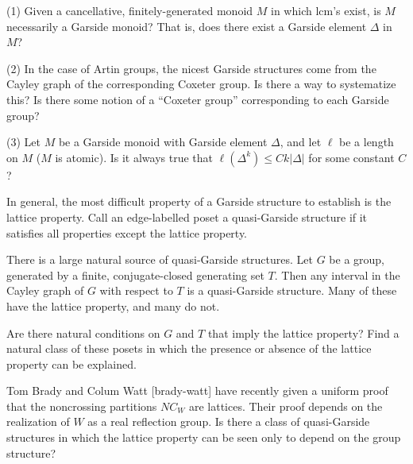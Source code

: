 \documentclass[12pt,letterpaper, reqno]{amsart}
\begin{document}
\begin{problemblock}
\begin{problem}[4.2] 

(1) Given a cancellative, finitely-generated monoid $M$ in which lcm's exist, is $M$ necessarily a Garside monoid? That is, does there exist a Garside element $\Delta$ in $M$?

(2) In the case of Artin groups, the nicest Garside structures come from the Cayley graph of the corresponding Coxeter group. Is there a way to systematize this? Is there some notion of a ``Coxeter group'' corresponding to each Garside group?

(3) Let $M$ be a Garside monoid with Garside element $\Delta$, and let $\ell$ be a length on $M$ ($M$ is atomic). Is it always true that $\ell(\Delta^k)\leq Ck\left|\Delta\right| $ for some constant $C$?

\end{problem}
\end{problemblock}

\begin{problemblock}
In general, the most difficult property of a Garside structure to establish is the lattice property. Call an edge-labelled poset a quasi-Garside structure if it satisfies all properties except the lattice property.

There is a large natural source of quasi-Garside structures. Let $G$
be a group, generated by a finite, conjugate-closed generating set
$T$. Then any interval in the Cayley graph of $G$ with respect to $T$
is a quasi-Garside structure. Many of these have the lattice property,
and many do not. 


\begin{problem}[4.3]
Are there natural conditions on $G$ and $T$ that imply
the lattice property? Find a natural class of these posets in which the
presence or absence of the lattice property can be explained.
\end{problem}

\begin{remark}
Tom Brady and Colum Watt [brady-watt] have recently given a uniform proof that the noncrossing partitions $NC_W$ are lattices. Their proof depends on the realization of $W$ as a real reflection group. Is there a class of quasi-Garside structures in which the lattice property can be seen only to depend on the group structure?
\end{remark}
\end{problemblock}
\end{document}
